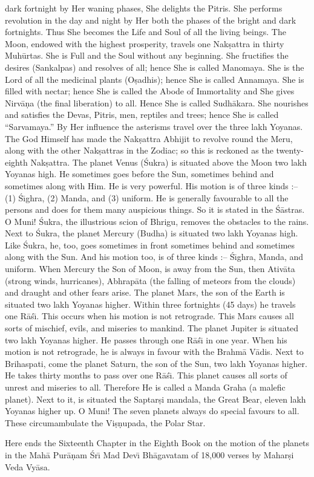 dark fortnight by Her waning phases, She delights the Pitris. She performs revolution in the day and night by Her both the phases of the bright and dark fortnights. Thus She becomes the Life and Soul of
all the living beings. The Moon, endowed with the highest prosperity, travels one Nak\d{s}attra in thirty Muh\=urtas. She is Full and the Soul without any beginning. She fructifies the desires (Sankalpas) and
resolves of all; hence She is called Manomaya. She is the Lord of all the medicinal plants (O\d{s}adhis); hence She is called Annamaya. She is filled with nectar; hence She is called the Abode of Immortality and She gives Nirv\=a\d{n}a (the final liberation) to all. Hence She is called Sudh\=akara. She nourishes and satisfies the Devas, Pitris, men, reptiles and trees; hence She is called ``Sarvamaya.'' By Her influence the asterisms travel over the three lakh Yoyanas. The God Himself has made the Nak\d{s}attra Abhijit to revolve round the Meru, along with the other Nak\d{s}attras in the Zodiac; so this is reckoned as the twenty-eighth Nak\d{s}attra. The planet Venus (\'Sukra) is situated above the Moon two lakh Yoyanas high. He sometimes goes before the Sun, sometimes behind and sometimes along with Him. He is very powerful. His motion is of three kinds :-- (1) \'S\={\i}ghra, (2) Manda, and (3) uniform. He is generally favourable to all the persons and does for them many auspicious things. So it is stated in the \'S\=astras. O Muni! \'Sukra, the illustrious scion of Bhrigu, removes the obstacles to the rains. Next to \'Sukra, the planet Mercury (Budha) is situated two lakh Yoyanas high. Like \'Sukra, he, too, goes sometimes in front sometimes behind and sometimes along with the Sun. And his motion too, is of three kinds :-- \'S\={\i}ghra, Manda, and uniform. When Mercury the Son of Moon, is away from the Sun, then Ativ\=ata (strong winds, hurricanes), Abhrap\=ata (the falling of meteors from the clouds) and draught and other fears arise. The planet Mars, the son of the Earth is situated two lakh Yoyanas higher. Within three fortnights (45 days) he travels one R\=a\'s\={\i}. This occurs when his motion is not retrograde. This Mars causes all sorts of mischief, evils, and miseries to mankind. The planet Jupiter is situated two lakh Yoyanas higher. He passes through one R\=a\'s\={\i} in one year. When his motion is not retrograde, he is always in favour with the Brahm\=a V\=adis. Next to Brihaspati, come the planet Saturn, the son of the Sun, two lakh Yoyanas higher. He takes thirty months to pass over one R\=a\'s\={\i}. This planet causes all sorts of unrest and miseries to all. Therefore He is called a Manda Graha (a malefic planet). Next to it, is situated the Saptar\d{s}i mandala, the Great Bear, eleven lakh Yoyanas higher up. O Muni! The seven planets always do special favours to all. These circumambulate the Vi\d{s}\d{n}upada, the Polar Star.

Here ends the Sixteenth Chapter in the Eighth Book on the motion of the planets in the Mah\=a Pur\=a\d{n}am \'Sr\={\i} Mad Dev\={\i} Bh\=agavatam of 18,000 verses by Mahar\d{s}i Veda Vy\=asa.



